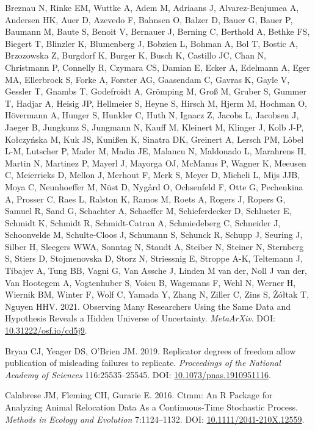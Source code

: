 \documentclass[10pt,a4paper]{article}
\newlength{\cslhangindent}
\newlength{\cslentryspacingunit} %
\newenvironment{CSLReferences}[2] %
 {%
  \setlength{\parindent}{0pt}
  \ifodd #1
  \let\oldpar\par
  \def\par{\hangindent=\cslhangindent\oldpar}
  \fi
  \setlength{\parskip}{#2\cslentryspacingunit}
 }%
 {}
\begin{document}
\begin{CSLReferences}{1}{0}
\leavevmode{}%
Breznau N, Rinke EM, Wuttke A, Adem M, Adriaans J, Alvarez-Benjumea A, Andersen HK, Auer D, Azevedo F, Bahnsen O, Balzer D, Bauer G, Bauer P, Baumann M, Baute S, Benoit V, Bernauer J, Berning C, Berthold A, Bethke FS, Biegert T, Blinzler K, Blumenberg J, Bobzien L, Bohman A, Bol T, Bostic A, Brzozowska Z, Burgdorf K, Burger K, Busch K, Castillo JC, Chan N, Christmann P, Connelly R, Czymara CS, Damian E, Ecker A, Edelmann A, Eger MA, Ellerbrock S, Forke A, Forster AG, Gaasendam C, Gavras K, Gayle V, Gessler T, Gnambs T, Godefroidt A, Grömping M, Groß M, Gruber S, Gummer T, Hadjar A, Heisig JP, Hellmeier S, Heyne S, Hirsch M, Hjerm M, Hochman O, Hövermann A, Hunger S, Hunkler C, Huth N, Ignacz Z, Jacobs L, Jacobsen J, Jaeger B, Jungkunz S, Jungmann N, Kauff M, Kleinert M, Klinger J, Kolb J-P, Kołczyńska M, Kuk JS, Kunißen K, Sinatra DK, Greinert A, Lersch PM, Löbel L-M, Lutscher P, Mader M, Madia JE, Malancu N, Maldonado L, Marahrens H, Martin N, Martinez P, Mayerl J, Mayorga OJ, McManus P, Wagner K, Meeusen C, Meierrieks D, Mellon J, Merhout F, Merk S, Meyer D, Micheli L, Mijs JJB, Moya C, Neunhoeffer M, Nüst D, Nygård O, Ochsenfeld F, Otte G, Pechenkina A, Prosser C, Raes L, Ralston K, Ramos M, Roets A, Rogers J, Ropers G, Samuel R, Sand G, Schachter A, Schaeffer M, Schieferdecker D, Schlueter E, Schmidt K, Schmidt R, Schmidt-Catran A, Schmiedeberg C, Schneider J, Schoonvelde M, Schulte-Cloos J, Schumann S, Schunck R, Schupp J, Seuring J, Silber H, Sleegers WWA, Sonntag N, Staudt A, Steiber N, Steiner N, Sternberg S, Stiers D, Stojmenovska D, Storz N, Striessnig E, Stroppe A-K, Teltemann J, Tibajev A, Tung BB, Vagni G, Van Assche J, Linden M van der, Noll J van der, Van Hootegem A, Vogtenhuber S, Voicu B, Wagemans F, Wehl N, Werner H, Wiernik BM, Winter F, Wolf C, Yamada Y, Zhang N, Ziller C, Zins S, Żółtak T, Nguyen HHV. 2021. Observing {Many} {Researchers} {Using} the {Same} {Data} and {Hypothesis} {Reveals} a {Hidden} {Universe} of {Uncertainty}. \emph{MetaArXiv}. DOI: \href{https://doi.org/10.31222/osf.io/cd5j9}{10.31222/osf.io/cd5j9}.

\leavevmode{}%
Bryan CJ, Yeager DS, O'Brien JM. 2019. Replicator degrees of freedom allow publication of misleading failures to replicate. \emph{Proceedings of the National Academy of Sciences} 116:25535--25545. DOI: \href{https://doi.org/10.1073/pnas.1910951116}{10.1073/pnas.1910951116}.

\leavevmode{}%
Calabrese JM, Fleming CH, Gurarie E. 2016. Ctmm: An {R} {Package} for {Analyzing} {Animal} {Relocation} {Data} {As} a {Continuous}-{Time} {Stochastic} {Process}. \emph{Methods in Ecology and Evolution} 7:1124--1132. DOI: \href{https://doi.org/10.1111/2041-210X.12559}{10.1111/2041-210X.12559}.


\end{CSLReferences}
\end{document}
